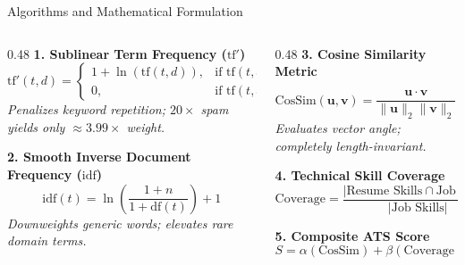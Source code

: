 \documentclass[aspectratio=169, 10pt]{beamer}
\begin{document}
\begin{frame}{Algorithms and Mathematical Formulation}
  \small
  \begin{columns}[T]
    \begin{column}{0.48\textwidth}
      \textbf{1. Sublinear Term Frequency ($\text{tf}'$)}
      $$\text{tf}'(t, d) = \begin{cases} 1 + \ln(\text{tf}(t, d)), & \text{if } \text{tf}(t, d) > 0 \\ 0, & \text{if } \text{tf}(t, d) = 0 \end{cases}$$
      \textit{Penalizes keyword repetition; $20\times$ spam yields only $\approx 3.99\times$ weight.}

      \vspace{0.2cm}
      \textbf{2. Smooth Inverse Document Frequency ($\text{idf}$)}
      $$\text{idf}(t) = \ln\left(\frac{1 + n}{1 + \text{df}(t)}\right) + 1$$
      \textit{Downweights generic words; elevates rare domain terms.}
    \end{column}

    \begin{column}{0.48\textwidth}
      \textbf{3. Cosine Similarity Metric}
      $$\text{CosSim}(\mathbf{u}, \mathbf{v}) = \frac{\mathbf{u} \cdot \mathbf{v}}{\|\mathbf{u}\|_2 \|\mathbf{v}\|_2} = \sum_{i=1}^{|V|} u_i \cdot v_i$$
      \textit{Evaluates vector angle; completely length-invariant.}

      \vspace{0.2cm}
      \textbf{4. Technical Skill Coverage}
      $$\text{Coverage} = \frac{|\text{Resume Skills} \cap \text{Job Skills}|}{|\text{Job Skills}|}$$

      \vspace{0.1cm}
      \textbf{5. Composite ATS Score}
      $$S = \alpha(\text{CosSim}) + \beta(\text{Coverage}), \quad \alpha + \beta = 1.0$$
    \end{column}
  \end{columns}
\end{frame}
\end{document}
